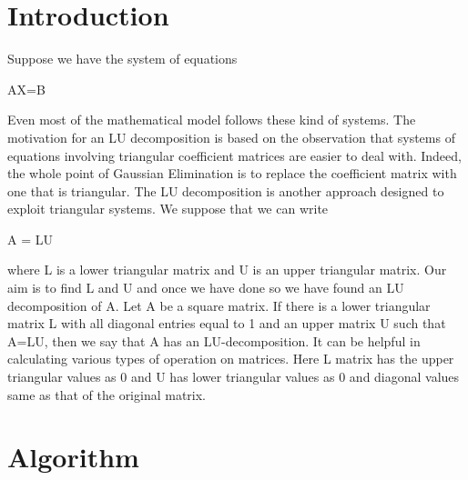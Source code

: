 \documentclass{sem5}
\author{Dilip Puri}
\begin{document}
\section{Introduction}
Suppose we have the system of equations
\begin{center}AX=B\end{center}
Even most of the mathematical model follows these kind of systems. The motivation for an LU decomposition is based on the observation that systems of equations involving triangular coefficient matrices are easier to deal with.  Indeed, the whole point of Gaussian Elimination is to replace the coefficient matrix with one that is triangular.  The LU decomposition is another approach designed to exploit triangular systems. We suppose that we can write
\begin{center}A = LU\end{center}
where L is a lower triangular matrix and U is an upper triangular matrix. Our aim is to find L and U and once we have done so we have found an LU decomposition of A.
Let A be a square matrix. If there is a lower triangular matrix L with all diagonal entries equal to 1 and an upper matrix U such that A=LU, then we say that A has an LU-decomposition. It can be helpful in calculating various types of operation on matrices. Here L matrix has the upper triangular values as 0 and U has lower triangular values as 0 and diagonal values same as that of the original matrix. 

\section{Algorithm}
\end{document}
